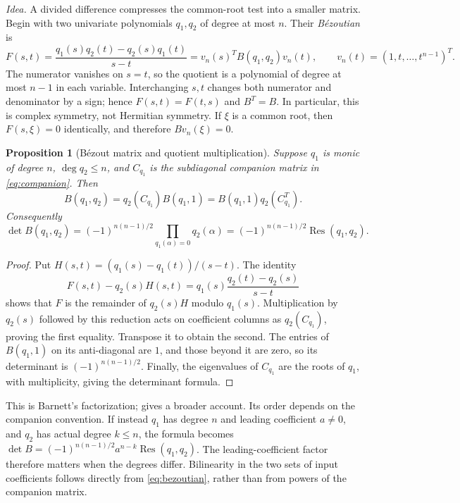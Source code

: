 \documentclass[12pt]{article}
\DeclareMathOperator{\Res}{Res}
\newtheorem{proposition}[theorem]{Proposition}
\theoremstyle{definition}
\theoremstyle{remark}
\begin{document}
\emph{Idea.} A divided difference compresses the common-root test into a
smaller matrix. Begin with two univariate polynomials $q_1,q_2$ of degree
at most $n$. Their \emph{B\'ezoutian} is
\begin{equation}\label{eq:bezoutian}
  F(s,t)=\frac{q_1(s)q_2(t)-q_2(s)q_1(t)}{s-t}
       =v_n(s)^TB(q_1,q_2)v_n(t),
  \qquad v_n(t)=(1,t,\ldots,t^{n-1})^T.
\end{equation}
The numerator vanishes on $s=t$, so the quotient is a polynomial of degree
at most $n-1$ in each variable. Interchanging $s,t$ changes both numerator
and denominator by a sign; hence $F(s,t)=F(t,s)$ and $B^T=B$. In particular,
this is complex symmetry, not Hermitian symmetry. If $\xi$ is a common
root, then $F(s,\xi)=0$ identically, and therefore $Bv_n(\xi)=0$.

\begin{proposition}[B\'ezout matrix and quotient multiplication]\label{rem:barnett}
  Suppose $q_1$ is monic of degree $n$, $\deg q_2\le n$, and $C_{q_1}$ is
  the subdiagonal companion matrix in \eqref{eq:companion}. Then
  \begin{equation}\label{eq:barnett}
    B(q_1,q_2)=q_2(C_{q_1})B(q_1,1)
             =B(q_1,1)q_2(C_{q_1}^{T}).
  \end{equation}
  Consequently
  \[
    \det B(q_1,q_2)=(-1)^{n(n-1)/2}
       \prod_{q_1(\alpha)=0}q_2(\alpha)
       =(-1)^{n(n-1)/2}\Res(q_1,q_2).
  \]
\end{proposition}

\begin{proof}
Put $H(s,t)=(q_1(s)-q_1(t))/(s-t)$. The identity
\[
  F(s,t)-q_2(s)H(s,t)
    =q_1(s)\frac{q_2(t)-q_2(s)}{s-t}
\]
shows that $F$ is the remainder of $q_2(s)H$ modulo $q_1(s)$.
Multiplication by $q_2(s)$ followed by this reduction acts on coefficient
columns as $q_2(C_{q_1})$, proving the first equality. Transpose it to obtain
the second. The entries of $B(q_1,1)$ on its anti-diagonal are $1$, and
those beyond it are zero, so its determinant is $(-1)^{n(n-1)/2}$.
Finally, the eigenvalues of $C_{q_1}$ are the roots of $q_1$, with
multiplicity, giving the determinant formula.
\end{proof}

This is Barnett's factorization; \cite{helmke1989bezoutians} gives a broader
account. Its order depends on the companion convention. If instead $q_1$
has degree $n$ and leading coefficient $a\ne0$, and $q_2$ has actual
degree $k\le n$, the formula becomes
$\det B=(-1)^{n(n-1)/2}a^{n-k}\Res(q_1,q_2)$.
The leading-coefficient factor therefore matters when the degrees differ.
Bilinearity in the two sets of input coefficients follows directly from
\eqref{eq:bezoutian}, rather than from powers of the companion matrix.
\end{document}
